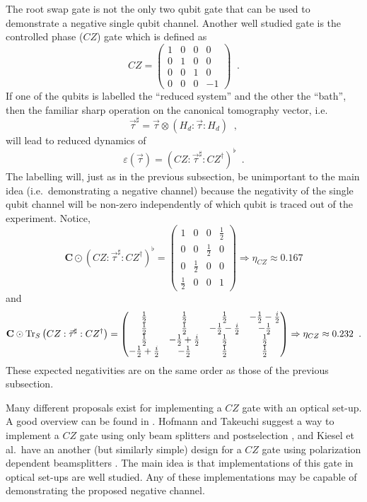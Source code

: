 The root swap gate is not the only two qubit gate that can be used to demonstrate a negative single qubit channel.  Another well studied gate is the controlled phase ($CZ$) gate which is defined as
$$
CZ = \begin{pmatrix}
1&0&0&0\\
0&1&0&0\\
0&0&1&0\\
0&0&0&-1
\end{pmatrix}\;\;.
$$
If one of the qubits is labelled the ``reduced system'' and the other the ``bath'', then the familiar sharp operation on the canonical tomography vector, i.e.\
$$
\vec{\tau}^\sharp = \vec{\tau} \otimes \left(H_d:\vec{\tau}:H_d\right)\;\;,
$$
will lead to reduced dynamics of
$$
\varepsilon(\vec{\tau}) = \left(CZ:\vec{\tau}^\sharp:CZ^\dagger\right)^\flat\;\;.
$$
The labelling will, just as in the previous subsection, be unimportant to the main idea (i.e.\ demonstrating a negative channel) because the negativity of the single qubit channel will be non-zero independently of which qubit is traced out of the experiment.  Notice,
\begin{equation}
\label{eqn:CZneg}
\mathbf{C}\odot \left(CZ:\vec{\tau}^\sharp:CZ^\dagger\right)^\flat = \begin{pmatrix}
 1 & 0 & 0 & \frac{1}{2} \\
 0 & 0 & \frac{1}{2} & 0 \\
 0 & \frac{1}{2} & 0 & 0 \\
 \frac{1}{2} & 0 & 0 & 1
\end{pmatrix}\Rightarrow\eta_{CZ} \approx 0.167 
\end{equation}
and
$$
\mathbf{C}\odot \operatorname{Tr}_S\left(CZ:\vec{\tau}^\sharp:CZ^\dagger\right) = \begin{pmatrix}
 \frac{1}{2} & \frac{1}{2} & \frac{1}{2} & -\frac{1}{2}-\frac{i}{2} \\
 \frac{1}{2} & \frac{1}{2} & -\frac{1}{2}-\frac{i}{2} & -\frac{1}{2} \\
 \frac{1}{2} & -\frac{1}{2}+\frac{i}{2} & \frac{1}{2} & \frac{1}{2} \\
 -\frac{1}{2}+\frac{i}{2} & -\frac{1}{2} & \frac{1}{2} & \frac{1}{2}
\end{pmatrix}\Rightarrow\eta_{CZ} \approx 0.232\;\;.
$$
These expected negativities are on the same order as those of the previous subsection.

Many different proposals exist for implementing a $CZ$ gate with an optical set-up.  A good overview can be found in \cite{Kieling2012}.  Hofmann and Takeuchi suggest a way to implement a $CZ$ gate using only beam splitters and postselection \cite{Hofmann2002}, and Kiesel et al.\ have an another (but similarly simple) design for a $CZ$ gate using polarization dependent beamsplitters \cite{Kiesel2005}.  The main idea is that implementations of this gate in optical set-ups are well studied.  Any of these implementations may be capable of demonstrating the proposed negative channel.  

